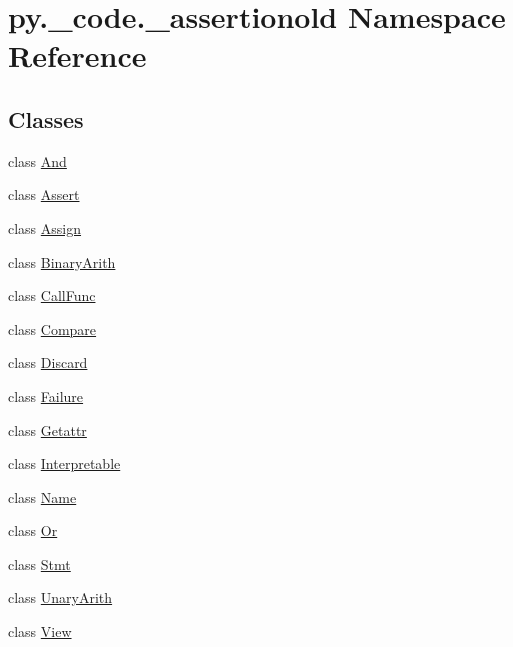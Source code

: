 \hypertarget{namespacepy_1_1__code_1_1__assertionold}{}\section{py.\+\_\+code.\+\_\+assertionold Namespace Reference}
\label{namespacepy_1_1__code_1_1__assertionold}
\subsection*{Classes}
\begin{DoxyCompactItemize}
\item 
class \hyperlink{classpy_1_1__code_1_1__assertionold_1_1_and}{And}
\item 
class \hyperlink{classpy_1_1__code_1_1__assertionold_1_1_assert}{Assert}
\item 
class \hyperlink{classpy_1_1__code_1_1__assertionold_1_1_assign}{Assign}
\item 
class \hyperlink{classpy_1_1__code_1_1__assertionold_1_1_binary_arith}{Binary\+Arith}
\item 
class \hyperlink{classpy_1_1__code_1_1__assertionold_1_1_call_func}{Call\+Func}
\item 
class \hyperlink{classpy_1_1__code_1_1__assertionold_1_1_compare}{Compare}
\item 
class \hyperlink{classpy_1_1__code_1_1__assertionold_1_1_discard}{Discard}
\item 
class \hyperlink{classpy_1_1__code_1_1__assertionold_1_1_failure}{Failure}
\item 
class \hyperlink{classpy_1_1__code_1_1__assertionold_1_1_getattr}{Getattr}
\item 
class \hyperlink{classpy_1_1__code_1_1__assertionold_1_1_interpretable}{Interpretable}
\item 
class \hyperlink{classpy_1_1__code_1_1__assertionold_1_1_name}{Name}
\item 
class \hyperlink{classpy_1_1__code_1_1__assertionold_1_1_or}{Or}
\item 
class \hyperlink{classpy_1_1__code_1_1__assertionold_1_1_stmt}{Stmt}
\item 
class \hyperlink{classpy_1_1__code_1_1__assertionold_1_1_unary_arith}{Unary\+Arith}
\item 
class \hyperlink{classpy_1_1__code_1_1__assertionold_1_1_view}{View}
\end{DoxyCompactItemize}
